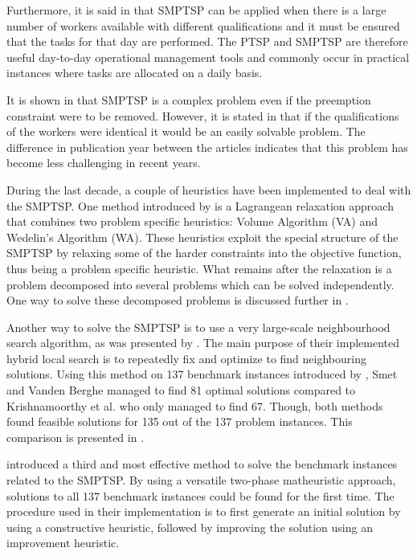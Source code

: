 Furthermore, it is said in \citet{krishnamoorthy_2012} that SMPTSP can be applied when there is a large number of workers available with different qualifications and it must be ensured that the tasks for that day are performed. The PTSP and SMPTSP are therefore useful day-to-day operational management tools and commonly occur in practical instances where tasks are allocated on a daily basis.

It is shown in \citet{kroon_1995} that SMPTSP is a complex problem even if the preemption constraint were to be removed. However, it is stated in \citet{krishnamoorthy_2012} that if the qualifications of the workers were identical it would be an easily solvable problem. The difference in publication year between the articles indicates that this problem has become less challenging in recent years.

During the last decade, a couple of heuristics have been implemented to deal with the SMPTSP. One method introduced by \citet{krishnamoorthy_2012} is a Lagrangean relaxation approach that combines two problem specific heuristics: Volume Algorithm (VA) and Wedelin's Algorithm (WA). These heuristics exploit the special structure of the SMPTSP by relaxing some of the harder constraints into the objective function, thus being a problem specific heuristic. What remains after the relaxation is a problem decomposed into several problems which can be solved independently. One way to solve these decomposed problems is discussed further in \citet{krishnamoorthy_2012}.

Another way to solve the SMPTSP is to use a very large-scale neighbourhood search algorithm, as was presented by \citet{smet_2012}. The main purpose of their implemented hybrid local search is to repeatedly fix and optimize to find neighbouring solutions. Using this method on 137 benchmark instances introduced by \citet{krishnamoorthy_2012}, Smet and Vanden Berghe managed to find 81 optimal solutions compared to Krishnamoorthy et al. who only managed to find 67. Though, both methods found feasible solutions for 135 out of the 137 problem instances. This comparison is presented in \citet{smet_2014}.

\citet{smet_2014} introduced a third and most effective method to solve the benchmark instances related to the SMPTSP. By using a versatile two-phase matheuristic approach, solutions to all 137 benchmark instances could be found for the first time. The procedure used in their implementation is to first generate an initial solution by using a constructive heuristic, followed by improving the solution using an improvement heuristic.



